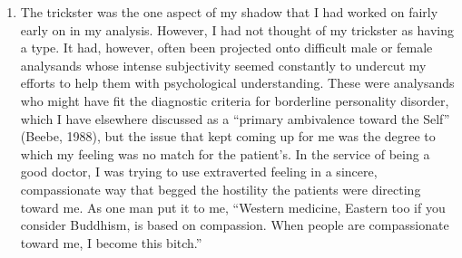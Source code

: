 \begin{enumerate}
    \item {} The trickster was the one aspect of my shadow
        that I had worked on fairly early on in my analysis. However, I had not
        thought of my trickster as having a type. It had, however, often been
        projected onto difficult male or female analysands whose intense
        subjectivity seemed constantly to undercut my efforts to help them with
        psychological understanding. These were analysands who might have fit
        the diagnostic criteria for borderline personality disorder, which I
        have elsewhere discussed as a “primary ambivalence toward the Self”
        (Beebe, 1988), but the issue that kept coming up for me was the degree
        to which my feeling was no match for the patient’s. In the service of
        being a good doctor, I was trying to use extraverted feeling in a
        sincere, compassionate way that begged the hostility the patients were
        directing toward me. As one man put it to me, “Western medicine,
        Eastern too if you consider Buddhism, is based on compassion. When
        people are compassionate toward me, I become this bitch.”


\end{enumerate}
